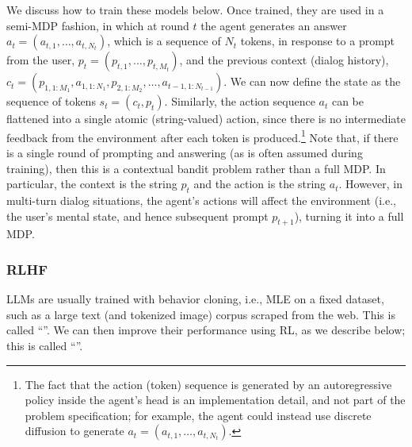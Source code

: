   
We discuss how to train these models below.
Once trained, they are used in a semi-MDP fashion, in which
at round $t$ the agent
generates an answer $a_t = (a_{t,1},\ldots, a_{t,N_t})$,
which is a sequence of $N_t$ tokens,
in response to a prompt from the user,
$p_t = (p_{t,1},\ldots, p_{t,M_t})$,
and the previous context (dialog history),
$c_t = (p_{1,1:M_1}, a_{1,1:N_1}, p_{2,1:M_2}, \ldots,  a_{t-1,1:N_{t-1}})$.
We can now define the state as the sequence of tokens   $s_t=(c_t,p_t)$.
Similarly, the action sequence $a_t$ can be flattened into a single atomic
(string-valued) action, since there is no
 intermediate feedback from the environment after each token is produced.\footnote{
 The fact that
 the action (token) sequence
 is generated by an autoregressive policy
 inside the agent's head is an implementation detail,
 and not part of the problem specification;
 for example, the agent could instead use discrete diffusion
 to generate $a_t = (a_{t,1},\ldots, a_{t,N_t})$.
 }
Note that, if there is a single round of prompting
  and answering (as is often assumed during training), then 
  this is a contextual bandit problem
  rather  than a full MDP.
  In particular, the context is the string $p_t$ and the action is
  the string $a_t$.
However, in multi-turn dialog situations, the agent's actions
will affect the environment (i.e., the user's mental state, and hence
subsequent prompt $p_{t+1}$), turning it into a full MDP.
 



\subsubsection{RLHF}
\label{sec:RLHF}

LLMs are usually trained with behavior cloning,
i.e., MLE on a fixed dataset,
such as  a large text (and tokenized image)
corpus scraped from the web.
This is called ``''.
We can then improve their performance using RL, as we describe below;
this is called ``''.

